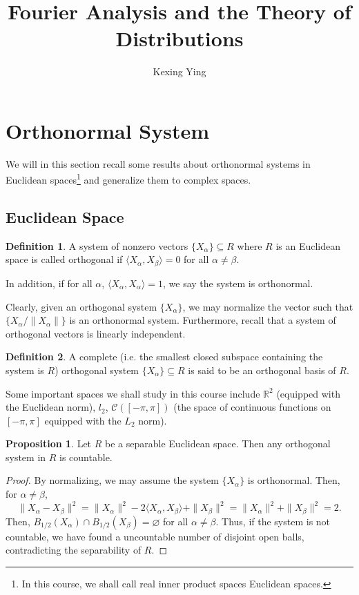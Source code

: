 \documentclass[]{article}
\title{Fourier Analysis and the Theory of Distributions}
\author{Kexing Ying}
\theoremstyle{definition}
\theoremstyle{definition}
\newtheorem{definition}{Definition}[section]
\newtheorem{proposition}{Proposition}[section]
\begin{document}
\maketitle

{
\hypersetup{linkcolor=}
\setcounter{tocdepth}{2}
\tableofcontents
}
\newpage

\section{Orthonormal System}

We will in this section recall some results about orthonormal systems in Euclidean 
spaces\footnote{In this course, we shall call real inner product spaces Euclidean 
spaces.} and generalize them to complex spaces. 

\subsection{Euclidean Space}

\begin{definition}
  A system of nonzero vectors \(\{X_\alpha\} \subseteq R\) where \(R\) is an 
  Euclidean space is called orthogonal if \(\langle X_\alpha, X_\beta\rangle = 0\)
  for all \(\alpha \neq \beta\). 

  In addition, if for all \(\alpha\), \(\langle X_\alpha, X_\alpha\rangle = 1\), 
  we say the system is orthonormal.
\end{definition}

Clearly, given an orthogonal system \(\{X_\alpha\}\), we may normalize the vector 
such that \(\{X_\alpha / \|X_\alpha\|\}\) is an orthonormal system. Furthermore, 
recall that a system of orthogonal vectors is linearly independent.

\begin{definition}
  A complete (i.e. the smallest closed subspace containing the system is \(R\)) 
  orthogonal system \(\{X_\alpha\} \subseteq R\) is said to 
  be an orthogonal basis of \(R\). 
\end{definition}

Some important spaces we shall study in this course include \(\mathbb{R}^2\) 
(equipped with the Euclidean norm), \(l_2\), \(\mathcal{C}([-\pi , \pi])\) 
(the space of continuous functions on \([-\pi, \pi]\) equipped with the \(L_2\) norm). 

\begin{proposition}
  Let \(R\) be a separable Euclidean space. Then any orthogonal system in \(R\) 
  is countable. 
\end{proposition}
\begin{proof}
  By normalizing, we may assume the system \(\{X_\alpha\}\) is orthonormal. Then, 
  for \(\alpha \neq \beta\),
  \[\|X_\alpha - X_\beta\|^2 = \|X_\alpha\|^2 - 2\langle X_\alpha, X_\beta\rangle + 
  \|X_\beta\|^2 = \|X_\alpha\|^2 + \|X_\beta\|^2 = 2.\]
  Then, \(B_{1 / 2}(X_\alpha) \cap B_{1 / 2}(X_\beta) = \varnothing\) for all 
  \(\alpha \neq \beta\). Thus, if the system is not countable, we have found 
  a uncountable number of disjoint open balls, contradicting the separability of 
  \(R\).
\end{proof}
\end{document}
